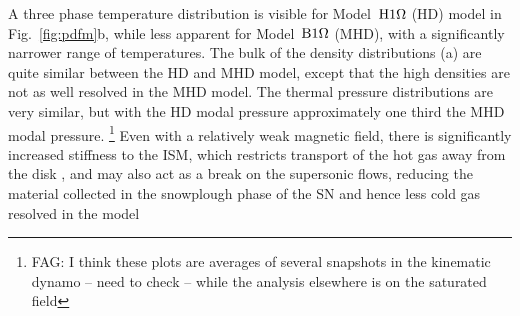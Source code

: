   A three phase temperature distribution is visible for Model~${\mathrm{H}1\rm{\Omega}}$ (HD)
  model in Fig.~\ref{fig:pdfm}b, while less apparent for Model~${\mathrm{B}1\rm{\Omega} }$ (MHD),
  with a significantly narrower range of temperatures.
  The bulk of the density distributions (a) are quite similar between the 
  HD and MHD model, except that the high densities are not as well resolved in
  the MHD model.
  The thermal pressure distributions are very similar, but with the HD modal
  pressure approximately one third the MHD modal pressure. 
  \footnote{FAG: I think these plots are averages of several snapshots in the 
  kinematic dynamo -- need to check -- while the analysis elsewhere is on the 
  saturated field}
  Even with a relatively weak magnetic field, there is significantly increased
  stiffness to the ISM, which restricts transport of the hot gas away from the
  disk \citep{Tomisaka98}, and may also act as a break on the supersonic
  flows, reducing the material collected in the snowplough phase of the SN and
  hence less cold gas resolved in the model \citep{Avillez04}
